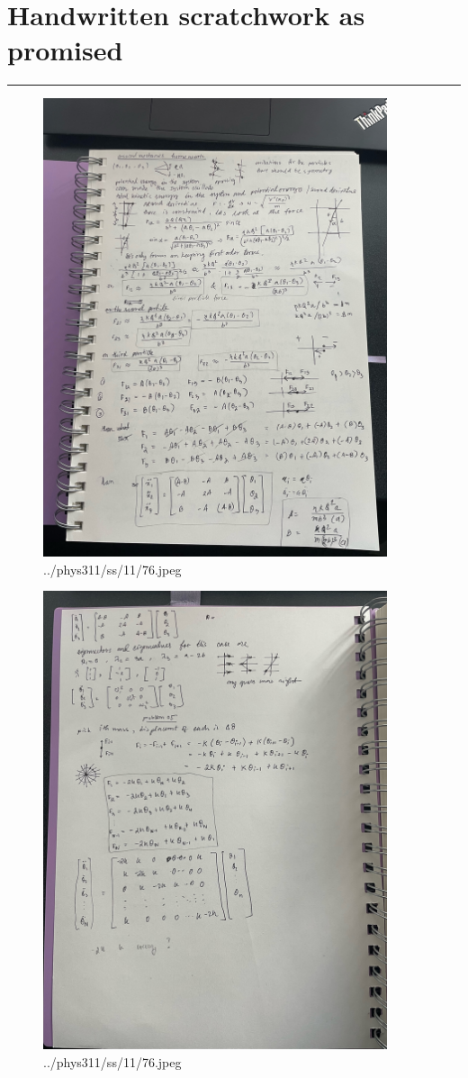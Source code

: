 \documentclass[letter, 10pts]{article}
\begin{document}
\section*{Handwritten scratchwork as promised} 
\hrule 
\begin{figure}[H]
	\centering
	\includegraphics[angle=270, width=0.9\textwidth]{../phys311/ss/11/5.jpeg}
	\caption{../phys311/ss/11/76.jpeg}
	\label{fig:-phys311-ss-11-76-jpeg}
\end{figure}

\begin{figure}[H]
	\centering
	\includegraphics[angle=270, width=0.9\textwidth]{../phys311/ss/11/76.jpeg}
	\caption{../phys311/ss/11/76.jpeg}
	\label{fig:-phys311-ss-11-76-jpeg}
\end{figure}
\end{document}
